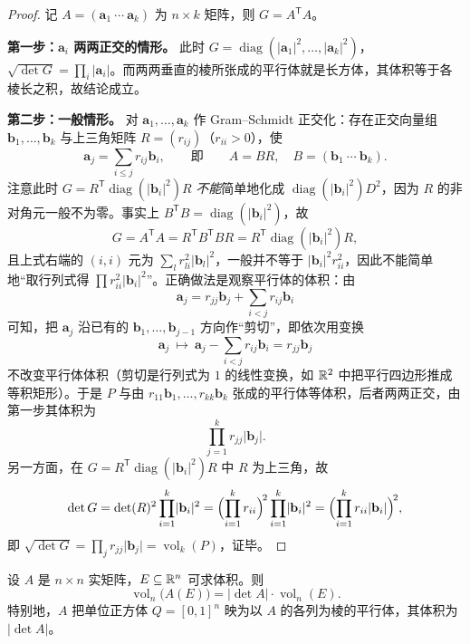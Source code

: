 \begin{proof}
记 \(A=(\mathbf{a}_1\ \cdots\ \mathbf{a}_k)\) 为 \(n\times k\) 矩阵，则 \(G=A^{\mathsf T}A\)。

\textbf{第一步：\(\mathbf{a}_i\) 两两正交的情形。} 此时 \(G=\operatorname{diag}(\lvert\mathbf{a}_1\rvert^2,\dots,\lvert\mathbf{a}_k\rvert^2)\)，\(\sqrt{\det G}=\prod_i\lvert\mathbf{a}_i\rvert\)。而两两垂直的棱所张成的平行体就是长方体，其体积等于各棱长之积，故结论成立。

\textbf{第二步：一般情形。} 对 \(\mathbf{a}_1,\dots,\mathbf{a}_k\) 作 Gram--Schmidt 正交化：存在正交向量组 \(\mathbf{b}_1,\dots,\mathbf{b}_k\) 与上三角矩阵 \(R=(r_{ij})\)（\(r_{ii}>0\)），使
\[
\mathbf{a}_j=\sum_{i\le j}r_{ij}\mathbf{b}_i ,
\qquad\text{即}\qquad A=B R,\quad B=(\mathbf{b}_1\ \cdots\ \mathbf{b}_k).
\]
注意此时 \(G=R^{\mathsf T}\operatorname{diag}(\lvert\mathbf{b}_i\rvert^2)R\) \emph{不能}简单地化成 \(\operatorname{diag}(\lvert\mathbf{b}_i\rvert^2)D^2\)，因为 \(R\) 的非对角元一般不为零。事实上 \(B^{\mathsf T}B=\operatorname{diag}(\lvert\mathbf{b}_i\rvert^2)\)，故
\[
G=A^{\mathsf T}A=R^{\mathsf T}B^{\mathsf T}BR=R^{\mathsf T}\operatorname{diag}(\lvert\mathbf{b}_i\rvert^2)R ,
\]
且上式右端的 \((i,i)\) 元为 \(\sum_{l}r_{li}^2\lvert\mathbf{b}_l\rvert^2\)，一般并不等于 \(\lvert\mathbf{b}_i\rvert^2r_{ii}^2\)，因此不能简单地“取行列式得 \(\prod r_{ii}^2\lvert\mathbf{b}_i\rvert^2\)”。正确做法是观察平行体的体积：由
\[
\mathbf{a}_j=r_{jj}\mathbf{b}_j+\sum_{i<j}r_{ij}\mathbf{b}_i
\]
可知，把 \(\mathbf{a}_j\) 沿已有的 \(\mathbf{b}_1,\dots,\mathbf{b}_{j-1}\) 方向作“剪切”，即依次用变换
\[
\mathbf{a}_j\ \longmapsto\ \mathbf{a}_j-\sum_{i<j}r_{ij}\mathbf{b}_i=r_{jj}\mathbf{b}_j
\]
不改变平行体体积（剪切是行列式为 \(1\) 的线性变换，如 \(\mathbb{R}^2\) 中把平行四边形推成等积矩形）。于是 \(P\) 与由 \(r_{11}\mathbf{b}_1,\dots,r_{kk}\mathbf{b}_k\) 张成的平行体等体积，后者两两正交，由第一步其体积为
\[
\prod_{j=1}^k r_{jj}\lvert\mathbf{b}_j\rvert .
\]
另一方面，在 \(G=R^{\mathsf T}\operatorname{diag}(\lvert\mathbf{b}_i\rvert^2)R\) 中 \(R\) 为上三角，故
\[
\det G=\det(R)^2\prod_{i=1}^k\lvert\mathbf{b}_i\rvert^2
=\Bigl(\prod_{i=1}^k r_{ii}\Bigr)^{\!2}\prod_{i=1}^k\lvert\mathbf{b}_i\rvert^2
=\Bigl(\prod_{i=1}^k r_{ii}\lvert\mathbf{b}_i\rvert\Bigr)^{\!2},
\]
即 \(\sqrt{\det G}=\prod_j r_{jj}\lvert\mathbf{b}_j\rvert=\operatorname{vol}_k(P)\)，证毕。
\end{proof}

\begin{lemma}
设 \(A\) 是 \(n\times n\) 实矩阵，\(E\subseteq\mathbb{R}^n\) 可求体积。则
\[
\operatorname{vol}_n\bigl(A(E)\bigr)=\left|\det A\right|\cdot\operatorname{vol}_n(E).
\]
特别地，\(A\) 把单位正方体 \(Q=[0,1]^n\) 映为以 \(A\) 的各列为棱的平行体，其体积为 \(\left|\det A\right|\)。
\end{lemma}

